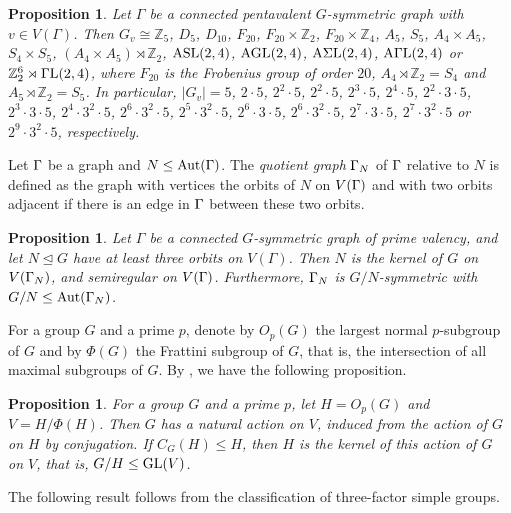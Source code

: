 \documentclass[12pt]{article}
\newtheorem{prop}[lem]{Proposition}%
\def\Aut{\hbox{\rm Aut}}
\begin{document}
\begin{prop}\label{prop=stabilizer} {\rm \cite[Theorem 1.1]{Guo}}
Let $\Gamma$ be a connected pentavalent $G$-symmetric graph with $v\in V(\Gamma)$. Then $G_v\cong \mathbb{Z}_5$, $D_{5}$, $D_{10}$, $F_{20}$, $F_{20}\times \mathbb{Z}_2$,
$ F_{20}\times \mathbb{Z}_4$, $A_5$, $S_5$, $A_4\times A_5$, $S_4\times S_5$, $(A_4\times A_5)\rtimes \mathbb{Z}_2$, $ {\rm ASL}(2,4)$, ${\rm AGL}(2,4)$,
${\rm A\Sigma L}(2,4)$, ${\rm A\Gamma L}(2,4)$ or $\mathbb{Z}^6_2\rtimes {\rm \Gamma L}(2,4)$, where $F_{20}$ is the Frobenius group of order $20$,
 $A_4\rtimes \mathbb{Z}_2=S_4$ and $A_5\rtimes \mathbb{Z}_2=S_5$.
In particular, $|G_v|=5$, $2\cdot 5$, $2^2\cdot 5$, $2^2\cdot 5$, $2^3\cdot 5$, $2^4\cdot 5$, $2^2\cdot 3 \cdot 5$, $2^3\cdot 3 \cdot 5$,
$2^4\cdot 3^2\cdot 5$, $2^6\cdot 3^2\cdot 5$, $2^5\cdot 3^2\cdot 5$, $2^6\cdot3 \cdot 5$, $2^6\cdot 3^2\cdot 5$, $2^7\cdot 3\cdot 5$, $2^7\cdot 3^2\cdot 5$
or $2^9\cdot 3^2\cdot 5$, respectively.
\end{prop}

Let $\Gamma$ be a graph and $N \leq \Aut(\G)$. The \emph{quotient graph} $\Gamma_N$ of $\Gamma$ relative to $N$ is defined as the graph with vertices the orbits of $N$ on $V(\Gamma)$ and with two orbits adjacent if there is an edge in $\Gamma$ between these two orbits.

\begin{prop}\label{prop=atlesst3orbits}{\rm \cite[Theorem 9]{Lorimer}}
Let $\Gamma$ be a connected $G$-symmetric graph of prime valency, and let $N\unlhd G$ have at least three orbits on $V(\Gamma)$. Then $N$ is the kernel of $G$ on $V(\Gamma_N)$, and semiregular on $V(\Gamma)$. Furthermore, $\Gamma_N$
is $G/N$-symmetric with $G/N \leq \Aut(\G_N)$.
\end{prop}

For a group $G$ and a prime $p$, denote by $O_p(G)$ the largest normal $p$-subgroup of $G$ and by $\Phi(G)$ the Frattini subgroup of $G$, that is,
the intersection of all maximal subgroups of $G$. By \cite[Lemma 2.7]{Wang}, we have the following proposition.


\begin{prop}\label{largest normal subgroup}
For a group $G$ and a prime $p$, let $H=O_p(G)$ and $V=H/\Phi(H)$. Then $G$ has a natural action on $V$, induced from the action of $G$ on $H$ by conjugation.
If $C_G(H)\leq H$, then $H$ is the kernel of this action of $G$ on $V$, that is, $G/H\leq \hbox{\rm GL}(V)$.
\end{prop}

The following result follows from the classification of three-factor simple groups.
\end{document}
